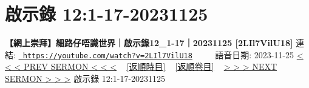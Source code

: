 \documentclass{book}
\begin{document}
\section{啟示錄 12:1-17-20231125}
\label{sec:2LIl7VilU18}
\textbf{【網上崇拜】細路仔唔識世界｜啟示錄12\_1-17｜20231125 [2LIl7VilU18]}
\newline
\newline
連結: \href{https://youtube.com/watch?v=2LIl7VilU18}{\texttt{ https://youtube.com/watch?v=2LIl7VilU18}} ~~~~ 語音日期: 2023-11-25 
\newline
\newline
\hyperref[sec:2LJqqGa1zFo]{\small{< < < PREV SERMON < < <}}
~
\hyperref[sec:index_chronic]{\small{[返順時目]}}
~
\hyperref[sec:index_scriptual]{\small{[返順卷目]}}
~
\hyperref[sec:w1NzLUX2_GE]{\small{> > > NEXT SERMON > > >}}
\newline
\newline
啟示錄 12:1-17-20231125
\newline
\end{document}
